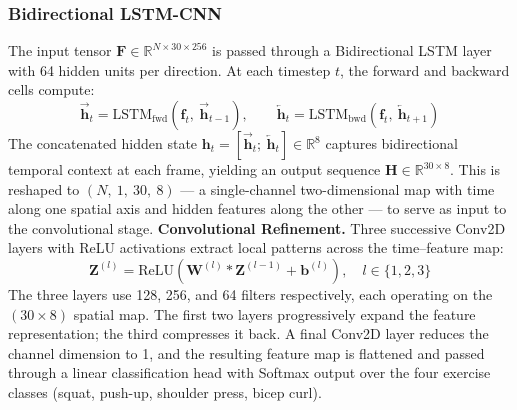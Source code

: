 \documentclass[conference,onecolumn,oneside]{IEEEtran}
\begin{document}
\subsubsection{Bidirectional LSTM-CNN}
\vspace{0.3cm}
The input tensor $\mathbf{F} \in \mathbb{R}^{N \times 30 \times 256}$
is passed through a Bidirectional LSTM layer with 64 hidden units per
direction. At each timestep $t$, the forward and backward cells compute:
\begin{equation}
\overrightarrow{\mathbf{h}}_t = \text{LSTM}_{\text{fwd}}
(\mathbf{f}_t,\ \overrightarrow{\mathbf{h}}_{t-1}), \qquad
\overleftarrow{\mathbf{h}}_t = \text{LSTM}_{\text{bwd}}
(\mathbf{f}_t,\ \overleftarrow{\mathbf{h}}_{t+1})
\end{equation}
The concatenated hidden state $\mathbf{h}_t =
[\overrightarrow{\mathbf{h}}_t;\ \overleftarrow{\mathbf{h}}_t] \in
\mathbb{R}^{8}$ captures bidirectional temporal context at each frame,
yielding an output sequence $\mathbf{H} \in \mathbb{R}^{30 \times 8}$.
This is reshaped to $(N,\ 1,\ 30,\ 8)$ --- a single-channel
two-dimensional map with time along one spatial axis and hidden
features along the other --- to serve as input to the convolutional
stage.
\textbf{Convolutional Refinement.}
Three successive Conv2D layers with ReLU activations extract local
patterns across the time--feature map:
\begin{equation}
\mathbf{Z}^{(l)} = \text{ReLU}\!\left(
\mathbf{W}^{(l)} * \mathbf{Z}^{(l-1)} + \mathbf{b}^{(l)}
\right), \quad l \in \{1, 2, 3\}
\end{equation}
The three layers use 128, 256, and 64 filters respectively, each
operating on the $(30 \times 8)$ spatial map. The first two layers
progressively expand the feature representation; the third compresses
it back. A final Conv2D layer reduces the channel dimension to 1, and
the resulting feature map is flattened and passed through a linear
classification head with Softmax output over the four exercise classes
(squat, push-up, shoulder press, bicep curl).

\vspace{0.3cm}
\end{document}
